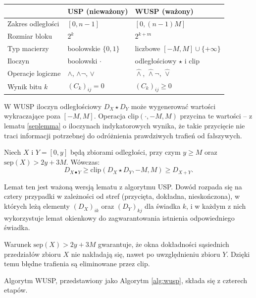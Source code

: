 \begin{center}
\renewcommand{\arraystretch}{1.3}
\begin{tabular}{|l|l|l|}
\hline
& \textbf{USP (nieważony)} & \textbf{WUSP (ważony)} \\
\hline
Zakres odległości & $[0, n-1]$ & $[0, (n-1)M]$ \\
Rozmiar bloku & $2^k$ & $2^{k+m}$ \\
Typ macierzy & boolowskie $\{0, 1\}$ & liczbowe $[-M, M] \cup \{+\infty\}$ \\
Iloczyn & boolowski $\cdot$ & odległościowy $\star$ i $\mathrm{clip}$ \\
Operacje logiczne & $\wedge$, $\wedge\neg$, $\vee$ & $\hat{\wedge}$, $\hat{\wedge}\neg$, $\hat{\vee}$ \\
Wynik bitu $k$ & $(C_k)_{ij} = 0$ & $(C_k)_{ij} \geq 0$ \\
\hline
\end{tabular}
\end{center}

W WUSP iloczyn odległościowy $D_X \star D_Y$ może wygenerować wartości wykraczające poza $[-M, M]$. Operacja $\mathrm{clip}(\cdot, -M, M)$ przycina te wartości -- z lematu \ref{seplemma} o iloczynach indykatorowych wynika, że takie przycięcie nie traci informacji potrzebnej do odróżnienia prawdziwych trafień od fałszywych.

\begin{lemat}
\label{seplemma}
Niech $X$ i $Y = [0, y]$ będą zbiorami odległości, przy czym $y \geq M$ oraz $\mathrm{sep}(X) > 2y + 3M$. Wówczas:
\[
D_{X \bullet Y} \geq \mathrm{clip}(D_X \star D_Y, -M, M) \geq D_{X+Y}.
\]
\end{lemat}

Lemat ten jest ważoną wersją lematu z algorytmu USP. Dowód rozpada się na cztery przypadki w zależności od stref (przycięta, dokładna, nieskończona), w których leżą elementy $(D_X)_{ik}$ oraz $(D_Y)_{kj}$ dla świadka $k$, i w każdym z nich wykorzystuje lemat okienkowy do zagwarantowania istnienia odpowiedniego świadka.

Warunek $\mathrm{sep}(X) > 2y + 3M$ gwarantuje, że okna dokładności sąsiednich przedziałów zbioru $X$ nie nakładają się, nawet po uwzględnieniu zbioru $Y$. Dzięki temu błędne trafienia są eliminowane przez $\mathrm{clip}$.


Algorytm WUSP, przedstawiony jako Algorytm \ref{alg:wusp}, składa się z czterech etapów.

